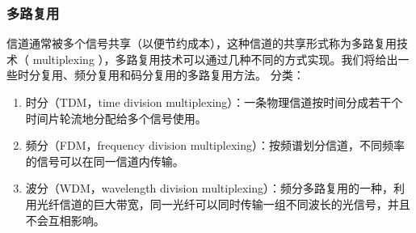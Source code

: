 \subsubsection{多路复用}
信道通常被多个信号共享（以便节约成本），这种信道的共享形式称为多路复用技术（ multiplexing ），多路复用技术可以通过几种不同的方式实现。我们将给出一些时分复用、频分复用和码分复用的多路复用方法。 
分类：
\begin{enumerate}
    \item 时分（TDM，time division multiplexing）：一条物理信道按时间分成若干个时间片轮流地分配给多个信号使用。
    \item 频分（FDM，frequency division multiplexing）：按频谱划分信道，不同频率的信号可以在同一信道内传输。
    \item 波分（WDM，wavelength division multiplexing）：频分多路复用的一种，利用光纤信道的巨大带宽，同一光纤可以同时传输一组不同波长的光信号，并且不会互相影响。
\end{enumerate}



